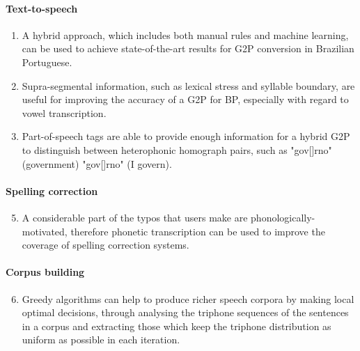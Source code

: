 \paragraph*{Text-to-speech}
  \begin{enumerate}
    \item A hybrid approach, which includes both manual rules and machine learning, can be used to achieve state-of-the-art results for \ac{G2P} conversion in Brazilian Portuguese.
    \item Supra-segmental information, such as lexical stress and syllable boundary, are useful for improving the accuracy of a \ac{G2P} for \ac{BP}, especially with regard to vowel transcription.
    \item Part-of-speech tags are able to provide enough information for a hybrid \ac{G2P} to distinguish between heterophonic homograph pairs, such as "gov[]rno" (government) "gov[]rno" (I govern).
  \end{enumerate}

\bigskip
\paragraph*{Spelling correction}
  \begin{enumerate}
    \setcounter{enumi}{4}
    \item A considerable part of the typos that users make are phonologically-motivated, therefore phonetic transcription can be used to improve the coverage of spelling correction systems.
  \end{enumerate}

  
\paragraph*{Corpus building}
  \begin{enumerate}
    \setcounter{enumi}{5}
    \item Greedy algorithms can help to produce richer speech corpora by making local optimal decisions, through analysing the triphone sequences of the sentences in a corpus and extracting those which keep the triphone distribution as uniform as possible in each iteration.
  \end{enumerate}

  
